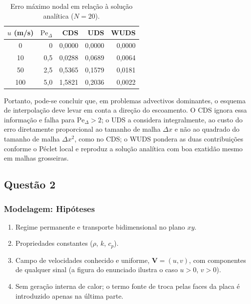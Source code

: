 \begin{table}[H]
\centering
\caption{Erro máximo nodal em relação à solução analítica ($N=20$).}
\begin{tabular}{crrrr}
\hline
$u$ (m/s) & $\mathrm{Pe}_{\Delta}$ & CDS & UDS & WUDS\\
\hline
0   & 0   & 0,0000 & 0,0000 & 0,0000\\
10  & 0,5 & 0,0288 & 0,0689 & 0,0064\\
50  & 2,5 & 0,5365 & 0,1579 & 0,0181\\
100 & 5,0 & 1,5821 & 0,2036 & 0,0022\\
\hline
\end{tabular}
\end{table}

Portanto, pode-se concluir que, em problemas advectivos dominantes, o esquema de interpolação deve levar em conta a direção do escoamento. O CDS ignora essa informação e falha para $\mathrm{Pe}_{\Delta}>2$; o UDS a considera integralmente, ao custo do erro diretamente proporcional ao tamanho de malha $\Delta x$ e não ao quadrado do tamanho de malha $\Delta x^2$, como no CDS; o WUDS pondera as duas contribuições conforme o Péclet local e reproduz a solução analítica com boa exatidão mesmo em malhas grosseiras.

\subsection*{Questão 2}

\subsubsection*{Modelagem: Hipóteses}

\begin{enumerate}
  \item Regime permanente e transporte bidimensional no plano $xy$.
  \item Propriedades constantes ($\rho$, $k$, $c_p$).
  \item Campo de velocidades conhecido e uniforme, $\mathbf{V}=(u,v)$, com
        componentes de qualquer sinal (a figura do enunciado ilustra o caso
        $u>0$, $v>0$).
  \item Sem geração interna de calor; o termo fonte de troca pelas faces da
        placa é introduzido apenas na última parte.
\end{enumerate}

